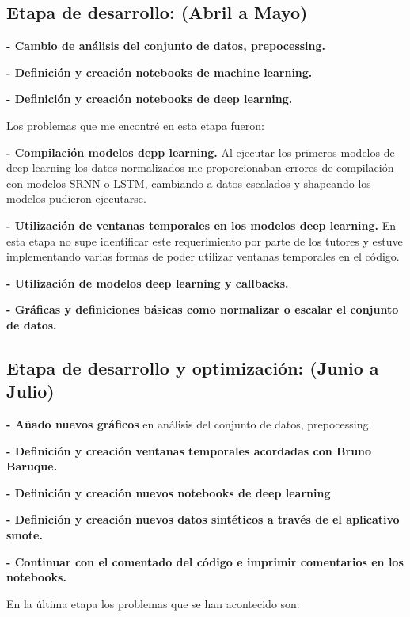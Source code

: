 \subsection{Etapa de desarrollo: (Abril a Mayo)}



\textbf{- Cambio de análisis del conjunto de datos, prepocessing.}

\textbf{- Definición y creación notebooks de machine learning.}

\textbf{- Definición y creación notebooks de deep learning.}


Los problemas que me encontré en esta etapa fueron:

\textbf{- Compilación modelos depp learning. }Al ejecutar los primeros modelos de deep learning los datos normalizados me proporcionaban errores de compilación con modelos SRNN o LSTM, cambiando a datos escalados y shapeando los modelos pudieron ejecutarse.

\textbf{- Utilización de ventanas temporales en los modelos deep learning.} En esta etapa no supe identificar este requerimiento por parte de los tutores y estuve implementando varias formas de poder utilizar ventanas temporales en el código.

\textbf{- Utilización de modelos deep learning y callbacks.} 

\textbf{- Gráficas y definiciones básicas como normalizar o escalar el conjunto de datos.}


\subsection{Etapa de desarrollo y optimización: (Junio a Julio)}



\textbf{- Añado nuevos gráficos} en análisis del conjunto de datos, prepocessing.

\textbf{- Definición y creación ventanas temporales acordadas con Bruno Baruque.}

\textbf{- Definición y creación nuevos notebooks de deep learning}

\textbf{- Definición y creación nuevos datos sintéticos a través de el aplicativo smote.}

\textbf{- Continuar con el comentado del código e imprimir comentarios en los notebooks.}


En la última etapa los problemas que se han acontecido son:

